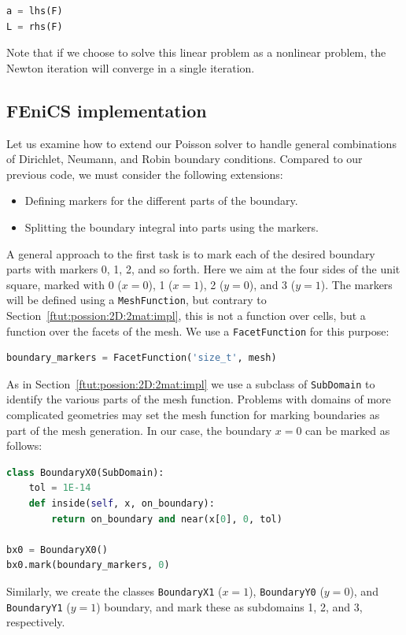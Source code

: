 \documentclass[graybox,envcountchap,sectrefs,final]{svmonodo}
\begin{document}
\begin{lstlisting}[language=Python,style=graycolor]
a = lhs(F)
L = rhs(F)
\end{lstlisting}
Note that if we choose to solve this linear problem as a nonlinear
problem, the Newton iteration will converge in a single iteration.


\subsection{FEniCS implementation}

Let us examine how to extend our Poisson solver to handle general
combinations of Dirichlet, Neumann, and Robin boundary conditions.
Compared to our previous code, we must consider the following
extensions:

\begin{itemize}
  \item Defining markers for the different parts of the boundary.

  \item Splitting the boundary integral into parts using the markers.
\end{itemize}

\noindent
A general approach to the first task is to mark each of the desired
boundary parts with markers 0, 1, 2, and so forth. Here we aim at the
four sides of the unit square, marked with 0 ($x=0$), 1 ($x=1$), 2
($y=0$), and 3 ($y=1$).  The markers will be defined using a
\texttt{MeshFunction}, but contrary to Section~\ref{ftut:possion:2D:2mat:impl}, this is not a function over cells, but
a function over the facets of the mesh. We use a \texttt{FacetFunction} for
this purpose:

\begin{lstlisting}[language=Python,style=graycolor]
boundary_markers = FacetFunction('size_t', mesh)
\end{lstlisting}
As in Section~\ref{ftut:possion:2D:2mat:impl} we use a subclass of
\texttt{SubDomain} to identify the various parts of the mesh
function. Problems with domains of more complicated geometries may set
the mesh function for marking boundaries as part of the mesh
generation.  In our case, the boundary $x = 0$ can be marked
as follows:

\begin{lstlisting}[language=Python,style=graycolor]
class BoundaryX0(SubDomain):
    tol = 1E-14
    def inside(self, x, on_boundary):
        return on_boundary and near(x[0], 0, tol)

bx0 = BoundaryX0()
bx0.mark(boundary_markers, 0)
\end{lstlisting}
Similarly, we create the classes \texttt{BoundaryX1} ($x=1$), \texttt{BoundaryY0}
($y=0$), and \texttt{BoundaryY1} ($y=1$) boundary, and mark these as
subdomains 1, 2, and 3, respectively.
\end{document}

